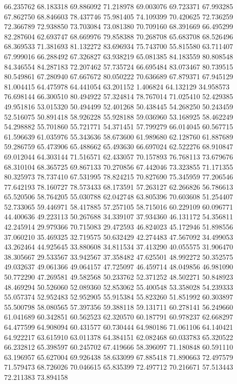 66.235762
68.183318
69.886092
71.218978
69.003076
69.723371
67.993285
67.862750
68.846603
78.437746
75.981405
74.109399
70.420625
72.736259
72.366789
72.938850
73.703084
73.081380
70.709160
68.391669
66.495299
82.287604
62.693747
68.669976
79.858388
70.268708
65.683708
68.526496
68.369533
71.381693
81.132272
83.696934
75.743700
55.815580
63.711407
67.999016
66.288492
67.326827
63.938219
65.081385
84.183559
80.808548
84.346554
84.287183
72.207462
57.735724
66.695484
83.073467
80.739515
80.549861
67.280940
67.667672
80.050222
70.636689
67.879371
67.945129
81.004415
64.475978
64.441054
63.201152
1.406824
64.132129
34.958573
76.698144
66.300510
80.494922
57.324814
78.767014
71.025410
52.429385
49.951816
53.015320
50.494499
52.401268
50.438445
54.268250
50.243459
52.516075
50.891418
58.926228
55.928188
59.036960
53.168925
58.462249
54.298882
55.701860
55.721771
54.371451
57.799279
66.014045
60.567715
61.596639
61.035976
55.343636
58.673600
61.989680
62.128760
61.887689
59.286759
65.473906
65.488662
65.493630
66.697024
62.522276
68.910847
69.012044
64.303144
71.516571
62.433057
70.157893
76.768113
73.679676
68.310104
68.365725
69.867133
70.270856
67.442046
73.323855
71.171355
80.325973
78.737410
67.531995
78.824215
70.827690
75.345959
77.206546
77.642193
78.160727
78.573433
68.173591
57.263127
62.266826
56.786613
65.520506
58.764205
55.030788
62.042748
63.805396
70.603608
51.254407
52.733065
59.446971
58.417885
57.257105
58.715016
60.229109
60.096771
44.400636
49.223113
50.267688
34.339107
37.934360
46.131172
54.356811
42.245914
29.979366
70.715083
29.472593
46.824023
45.172946
51.898556
37.060210
35.469325
32.719575
50.632429
42.274483
47.567092
34.499053
43.262464
44.925645
33.880608
34.811534
37.413290
40.055575
31.906470
38.305667
29.533567
33.942567
37.358482
47.625501
48.992272
50.352575
49.032637
49.061366
49.064157
47.725097
46.459714
48.049856
46.981090
50.772290
47.269581
49.582568
50.233762
52.371252
48.502271
50.848923
48.469294
50.526060
52.089360
52.853062
55.400548
53.358028
54.239333
55.057374
52.952483
52.952905
55.915384
55.823260
51.851992
60.303897
55.500798
58.080565
57.397356
59.388118
59.131711
60.278141
56.249660
61.041689
60.342851
60.562523
62.320570
60.187791
60.978237
62.668297
64.477599
64.908094
60.431577
60.730444
64.980186
71.061106
64.140421
64.922217
63.615910
63.011378
64.384151
62.082468
60.033783
65.320522
66.232812
65.398597
60.245702
67.419666
58.396097
71.180848
60.591110
63.196957
65.627004
69.926438
58.633099
67.885418
71.890663
72.497579
71.579473
68.726026
70.046615
65.835399
72.497712
70.216671
57.513443
72.211383
73.894158
